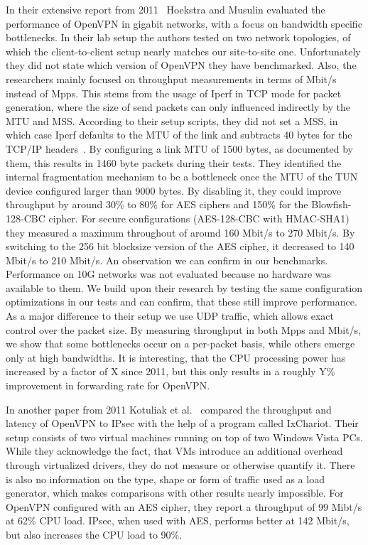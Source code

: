 \documentclass[IN,11pt,twoside,openright,master,english]{tumthesis}
\begin{document}
In their extensive report from 2011~\cite{hoekstra2011comparing} Hoekstra and Musulin evaluated the performance of OpenVPN in gigabit networks, with a focus on bandwidth specific bottlenecks. 
In their lab setup the authors tested on two network topologies, of which the client-to-client setup nearly matches our site-to-site one.
Unfortunately they did not state which version of OpenVPN they have benchmarked.
Also, the researchers mainly focused on throughput measurements in terms of Mbit/s instead of Mpps. This stems from the usage of Iperf in TCP mode for packet generation, where the size of send packets can only influenced indirectly by the MTU and MSS. According to their setup scripts, they did not set a MSS, in which case Iperf defaults to the MTU of the link and subtracts 40 bytes for the TCP/IP headers~\cite{iperf-man-page}. By configuring a link MTU of 1500 bytes, as documented by them, this results in 1460 byte packets during their tests.
They identified the internal fragmentation mechanism to be a bottleneck once the MTU of the TUN device configured larger than 9000 bytes. By disabling it, they could improve throughput by around 30\% to 80\% for AES ciphers and 150\% for the Blowfish-128-CBC cipher.
For secure configurations (AES-128-CBC with HMAC-SHA1) they measured a maximum throughout of around 160 Mbit/s to 270 Mbit/s. By switching to the 256 bit blocksize version of the AES cipher, it decreased to 140 Mbit/s to 210 Mbit/s. An observation we can confirm in our benchmarks.
Performance on 10G networks was not evaluated because no hardware was available to them.
We build upon their research by testing the same configuration optimizations in our tests and can confirm, that these still improve performance. 
As a major difference to their setup we use UDP traffic, which allows exact control over the packet size. 
By measuring throughput in both Mpps and Mbit/s, we show that some bottlenecks occur on a per-packet basis, while others emerge only at high bandwidths.
It is interesting, that the CPU processing power has increased by a factor of X since 2011, but this only results in a roughly Y\% improvement in forwarding rate for OpenVPN.

In another paper from 2011 Kotuliak et al.~\cite{kotuliak2011performance} compared the throughput and latency of OpenVPN to IPsec with the help of a program called IxChariot. Their setup consists of two virtual machines running on top of two Windows Vista PCs. While they acknowledge the fact, that VMs introduce an additional overhead through virtualized drivers, they do not measure or otherwise quantify it.
There is also no information on the type, shape or form of traffic used as a load generator, which makes comparisons with other results nearly impossible.
For OpenVPN configured with an AES cipher, they report a throughput of 99 Mibt/s at 62\% CPU load. IPsec, when used with AES, performs better at 142 Mbit/s, but also increases the CPU load to 90\%.
\end{document}
